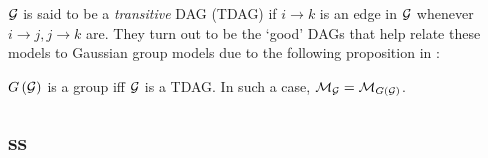 ${\mathcal{G}}$ is said to be a \emph{transitive} DAG (TDAG) if $i\to k$ is an edge in ${\mathcal{G}}$ whenever $i\to j, j\to k$ are. They turn out to be the `good' DAGs that help relate these models to Gaussian group models due to the following proposition in \cite{mainpaper}:

\begin{theorem}\label{tdag_thm}
$G\left({\mathcal{G}}\right)$ is a group iff ${\mathcal{G}}$ is a TDAG. In such a case, ${\mathcal{M}}_{\mathcal{G}} = {\mathcal{M}}_{G\left({\mathcal{G}}\right)}$.
\end{theorem}

\subsection{ss}







